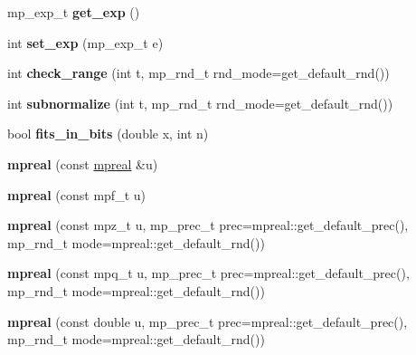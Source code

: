 \begin{DoxyCompactItemize}
mp\+\_\+exp\+\_\+t {\bfseries get\+\_\+exp} ()
\item 
\mbox{\label{classmpfr_1_1mpreal_a6479b3d4adbffa32090235272bde717f}} 
int {\bfseries set\+\_\+exp} (mp\+\_\+exp\+\_\+t e)
\item 
\mbox{\label{classmpfr_1_1mpreal_aa26641b86f5da7ea4d6c2c152c4f0478}} 
int {\bfseries check\+\_\+range} (int t, mp\+\_\+rnd\+\_\+t rnd\+\_\+mode=get\+\_\+default\+\_\+rnd())
\item 
\mbox{\label{classmpfr_1_1mpreal_a3e1259ddd0b70e450f180416fcb6ebe4}} 
int {\bfseries subnormalize} (int t, mp\+\_\+rnd\+\_\+t rnd\+\_\+mode=get\+\_\+default\+\_\+rnd())
\item 
\mbox{\label{classmpfr_1_1mpreal_af2562b87b51837e39296db6c224ec034}} 
bool {\bfseries fits\+\_\+in\+\_\+bits} (double x, int n)
\item 
\mbox{\label{classmpfr_1_1mpreal_a74b08628ebe3b25cb7e08d28bc87a42d}} 
{\bfseries mpreal} (const \hyperlink{classmpfr_1_1mpreal}{mpreal} \&u)
\item 
\mbox{\label{classmpfr_1_1mpreal_afc57c4273e1547f98db16b41bc304e14}} 
{\bfseries mpreal} (const mpf\+\_\+t u)
\item 
\mbox{\label{classmpfr_1_1mpreal_ad991d6226d8cdd978d743ceefa3969e5}} 
{\bfseries mpreal} (const mpz\+\_\+t u, mp\+\_\+prec\+\_\+t prec=mpreal\+::get\+\_\+default\+\_\+prec(), mp\+\_\+rnd\+\_\+t mode=mpreal\+::get\+\_\+default\+\_\+rnd())
\item 
\mbox{\label{classmpfr_1_1mpreal_af8647b1b46480b35ca71ca8b4e963471}} 
{\bfseries mpreal} (const mpq\+\_\+t u, mp\+\_\+prec\+\_\+t prec=mpreal\+::get\+\_\+default\+\_\+prec(), mp\+\_\+rnd\+\_\+t mode=mpreal\+::get\+\_\+default\+\_\+rnd())
\item 
\mbox{\label{classmpfr_1_1mpreal_a719c3d6efce9bf4edf605793b3017a9f}} 
{\bfseries mpreal} (const double u, mp\+\_\+prec\+\_\+t prec=mpreal\+::get\+\_\+default\+\_\+prec(), mp\+\_\+rnd\+\_\+t mode=mpreal\+::get\+\_\+default\+\_\+rnd())

\end{DoxyCompactItemize}
